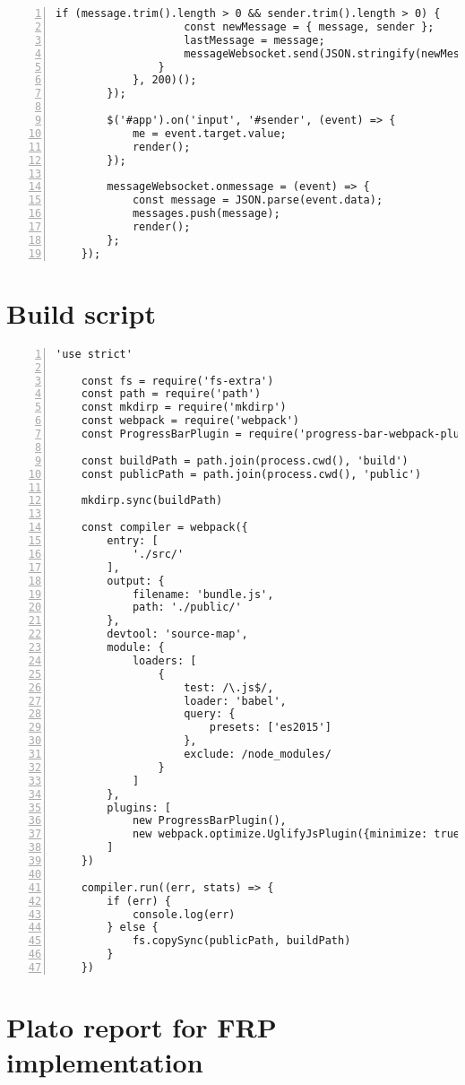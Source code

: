\begin{appendices}
\begin{lstlisting}[numbers=left]
				if (message.trim().length > 0 && sender.trim().length > 0) {
					const newMessage = { message, sender };
					lastMessage = message;
					messageWebsocket.send(JSON.stringify(newMessage));
				}
			}, 200)();
		});
		
		$('#app').on('input', '#sender', (event) => {
			me = event.target.value;
			render();
		});
		
		messageWebsocket.onmessage = (event) => {
			const message = JSON.parse(event.data);
			messages.push(message);
			render();
		};
	});
	\end{lstlisting}
	
	\chapter{Build script}
	\label{appendix:build}
	
	\begin{lstlisting}[numbers=left]
	'use strict'
	
	const fs = require('fs-extra')
	const path = require('path')
	const mkdirp = require('mkdirp')
	const webpack = require('webpack')
	const ProgressBarPlugin = require('progress-bar-webpack-plugin')
	
	const buildPath = path.join(process.cwd(), 'build')
	const publicPath = path.join(process.cwd(), 'public')
	
	mkdirp.sync(buildPath)
	
	const compiler = webpack({
		entry: [
			'./src/'
		],
		output: {
			filename: 'bundle.js',
			path: './public/'
		},
		devtool: 'source-map',
		module: {
			loaders: [
				{
					test: /\.js$/,
					loader: 'babel',
					query: {
						presets: ['es2015']
					},
					exclude: /node_modules/
				}
			]
		},
		plugins: [
			new ProgressBarPlugin(),
			new webpack.optimize.UglifyJsPlugin({minimize: true})
		]
	})
	
	compiler.run((err, stats) => {
		if (err) {
			console.log(err)
		} else {
			fs.copySync(publicPath, buildPath)
		}
	})
	\end{lstlisting}
	
	\chapter{Plato report for FRP implementation}
	\label{appendix:plato-frp}
	

\end{appendices}
